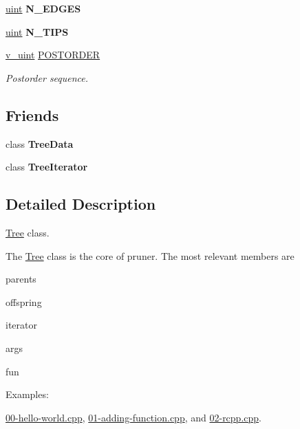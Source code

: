 \begin{DoxyCompactItemize}
\item 
\hyperlink{namespacepruner_a659e6e64a9e2b8e981c3d34262a2f67e}{uint} {\bfseries N\+\_\+\+E\+D\+G\+ES}\hypertarget{classpruner_1_1Tree_af3e29b31a9fd7e634df390462a44ef19}{}\label{classpruner_1_1Tree_af3e29b31a9fd7e634df390462a44ef19}

\item 
\hyperlink{namespacepruner_a659e6e64a9e2b8e981c3d34262a2f67e}{uint} {\bfseries N\+\_\+\+T\+I\+PS}\hypertarget{classpruner_1_1Tree_a606f20955acf7bc96c2647d6852fe129}{}\label{classpruner_1_1Tree_a606f20955acf7bc96c2647d6852fe129}

\item 
\hyperlink{namespacepruner_af0145646bd7ede012cd336b416bc5579}{v\+\_\+uint} \hyperlink{classpruner_1_1Tree_a547937e845fdbceafae4db25cd74f880}{P\+O\+S\+T\+O\+R\+D\+ER}
\begin{DoxyCompactList}\small\item\em Postorder sequence. \end{DoxyCompactList}\end{DoxyCompactItemize}
\subsection*{Friends}
\begin{DoxyCompactItemize}
\item 
class {\bfseries Tree\+Data}\hypertarget{classpruner_1_1Tree_a3ef069a6a857ec671312e3f76cb5aa24}{}\label{classpruner_1_1Tree_a3ef069a6a857ec671312e3f76cb5aa24}

\item 
class {\bfseries Tree\+Iterator}\hypertarget{classpruner_1_1Tree_a925e5a7f5dc110e63f7062d0e6898af9}{}\label{classpruner_1_1Tree_a925e5a7f5dc110e63f7062d0e6898af9}

\end{DoxyCompactItemize}


\subsection{Detailed Description}
\hyperlink{classpruner_1_1Tree}{Tree} class. 

The \hyperlink{classpruner_1_1Tree}{Tree} class is the core of pruner. The most relevant members are
\begin{DoxyItemize}
\item {\ttfamily parents}
\item {\ttfamily offspring}
\item {\ttfamily iterator}
\item {\ttfamily args}
\item {\ttfamily fun} 
\end{DoxyItemize}\begin{Desc}
\item[Examples\+: ]\par
\hyperlink{00-hello-world_8cpp-example}{00-\/hello-\/world.\+cpp}, \hyperlink{01-adding-function_8cpp-example}{01-\/adding-\/function.\+cpp}, and \hyperlink{02-rcpp_8cpp-example}{02-\/rcpp.\+cpp}.\end{Desc}


